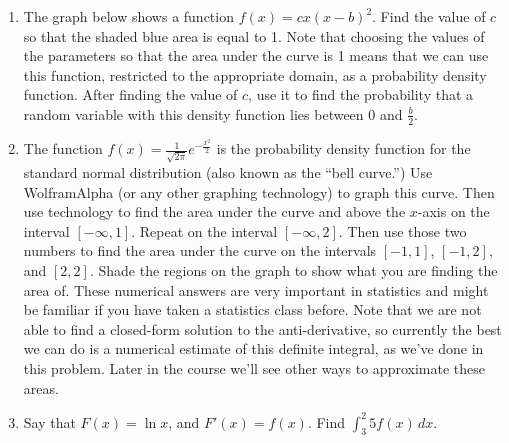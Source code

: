 \documentclass{article}
\begin{document}
\begin{itemize}
\begin{enumerate}
    \item The graph below shows a function $f(x) = cx(x-b)^2$. Find the value of $c$ so that the shaded blue area is equal to 1. Note that choosing the values of the parameters so that the area under the curve is 1 means that we can use this function, restricted to the appropriate domain, as a probability density function. After finding the value of $c$, use it to find the probability that a random variable with this density function lies between 0 and $\displaystyle \frac{b}{2}$.
    \begin{center}
\end{center}


\item  The function $\displaystyle f(x) = \frac{1}{\sqrt{2\pi}}e^{-\frac{x^2}{2}}$ is the probability density function for the standard normal distribution (also known as the ``bell curve.'') Use WolframAlpha (or any other
graphing technology) to graph this curve. Then use technology to find the area under the curve and above the $x$-axis on the interval $[-\infty,1]$. Repeat on the interval $[-\infty,2]$. Then use those two numbers to find the area under the curve on the intervals $[-1,1]$, $[-1, 2]$, and $[2,2]$. Shade the regions on the graph to show what you are finding the area of. These numerical answers are very important in statistics and might be familiar if you have taken a statistics class before. Note that we are not able to find a closed-form solution to the anti-derivative, so currently the best we can do is a numerical estimate of this definite integral, as we've done in this problem. Later in the course we'll see other ways to approximate these areas.
\item Say that $F(x)= \ln{x}$, and $F'(x)=f(x)$. Find $\displaystyle \int_3^2 5f(x) \,dx$.



\end{enumerate}
\end{itemize}
\end{document}
